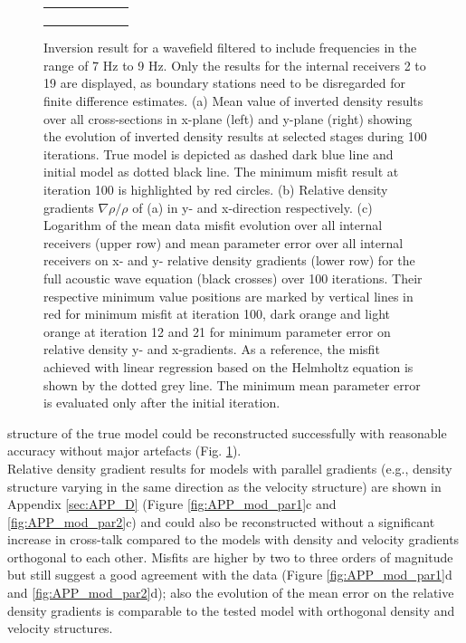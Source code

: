 \documentclass{article}
\begin{document}
\begin{figure}[H]
\begin{tabular}[c]{c}
\begin{subfigure}[c]{0.7\linewidth}
		\end{subfigure}
		\end{tabular}
	\caption{Inversion result for a wavefield filtered to include frequencies in the range of 7 Hz to 9 Hz. Only the results for the internal receivers 2 to 19 are displayed, as boundary stations need to be disregarded for finite difference estimates. (a) Mean value of inverted density results over all cross-sections in x-plane (left) and y-plane (right) showing the evolution of inverted density results at selected stages during 100 iterations. True model is depicted as dashed dark blue line and initial model as dotted black line. The minimum misfit result at iteration 100 is highlighted by red circles. (b) Relative density gradients $\nabla \rho/\rho$ of  (a) in y- and x-direction respectively. (c) Logarithm of the mean data misfit evolution over all internal receivers (upper row) and mean parameter error over all internal receivers on x- and y- relative density gradients (lower row) for the full acoustic wave equation (black crosses) over 100 iterations. Their respective minimum value positions are marked by vertical lines in red for minimum misfit at iteration 100, dark orange and light orange at iteration 12 and 21 for minimum parameter error on relative density y- and x-gradients. As a reference, the misfit achieved with linear regression based on the Helmholtz equation is shown by the dotted grey line. The minimum mean parameter error is evaluated only after the initial iteration.}
	\label{fig:rho_est_8Hz}
	\end{figure}

	structure of the true model could be reconstructed successfully with reasonable accuracy without major artefacts (Fig. \ref{fig:rho_est_8Hz}).\\
	
	Relative density gradient results for models with parallel gradients (e.g., density structure varying in the same direction as the velocity structure) are shown in Appendix \ref{sec:APP_D} (Figure \ref{fig:APP_mod_par1}c and \ref{fig:APP_mod_par2}c) and could also be reconstructed without a significant increase in cross-talk compared to the models with density and velocity gradients orthogonal to each other. Misfits are higher by two to three orders of magnitude but still suggest a good agreement with the data (Figure \ref{fig:APP_mod_par1}d and \ref{fig:APP_mod_par2}d); also the evolution of the mean error on the relative density gradients is comparable to the tested model with orthogonal density and velocity structures.\\
	
\end{document}
